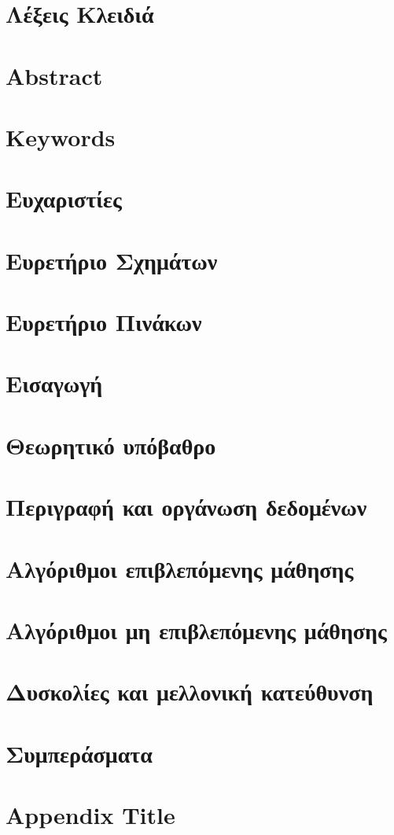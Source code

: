 \documentclass[11pt, a4paper, english, greek, twoside]{report}
\begin{document}
\chapter*{Λέξεις Κλειδιά}
\chapter*{Abstract}
\chapter*{Keywords} 
\chapter*{Ευχαριστίες}
\tableofcontents{}
\chapter*{Ευρετήριο Σχημάτων}
\chapter*{Ευρετήριο Πινάκων}

\chapter{Εισαγωγή}


\chapter{Θεωρητικό υπόβαθρο}


\chapter{Περιγραφή και οργάνωση δεδομένων}


\chapter{Αλγόριθμοι επιβλεπόμενης μάθησης}


\chapter{Αλγόριθμοι μη επιβλεπόμενης μάθησης}


\chapter{Δυσκολίες και μελλονική κατεύθυνση}


\chapter{Συμπεράσματα}


\appendix
\chapter{Appendix Title}
%
\end{document}
